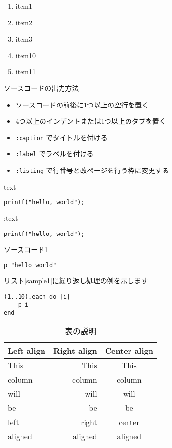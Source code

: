 \documentclass[a4j]{jarticle}
\begin{document}
\begin{enumerate}
\item item1
\item item2
\item item3
\item item10
\item item11
\end{enumerate}

ソースコードの出力方法

\begin{itemize}
\item ソースコードの前後に1つ以上の空行を置く
\item 4つ以上のインデントまたは1つ以上のタブを置く
\item {\tt :caption} でタイトルを付ける
\item {\tt :label} でラベルを付ける
\item {\tt :listing} で行番号と改ページを行う枠に変更する
\end{itemize}

text
\begin{screen}\begin{verbatim}
printf("hello, world");
\end{verbatim}\end{screen}

:text

\begin{verbatim}printf("hello, world");
\end{verbatim}

\begin{itembox}[c]{ソースコード1}\begin{verbatim}
p "hello world"
\end{verbatim}\end{itembox}

リスト\ref{sample1}に繰り返し処理の例を示します

\begin{lstlisting}[caption=繰り返しの例 ,label=sample1]
(1..10).each do |i|
	p i
end
\end{lstlisting}

\begin{table}[h]
\centering
\caption{表の説明 }
\label{table:1}
\begin{tabular}{|l|r|c|}
\hline
Left align & Right align & Center align\\
\hline
This & This & This\\
column & column & column\\
will & will & will\\
be & be & be\\
left & right & center\\
aligned & aligned & aligned\\
\hline
\end{tabular}
\end{table}
\end{document}
